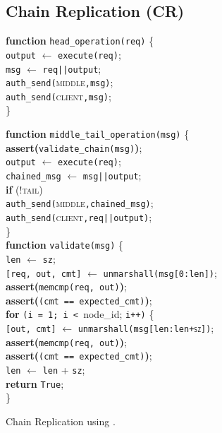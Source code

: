 %




\subsection{Chain Replication (CR)}\label{sec:use_cases::byz_chain_rep}

\begin{algorithm}
\SetAlgoLined
\small
\textbf{function} \texttt{head\_operation(req)} \{ \\
\Indp
 {\tt output} $\leftarrow$ \texttt{execute(req)};\\
 {\tt msg} $\leftarrow$ \texttt{req||output};\\
 \texttt{auth\_send(}\textsc{middle}{\tt,msg)};\\ \texttt{auth\_send(}\textsc{client}{\tt,msg)};\\
\Indm
\} \\

\vspace{0.15cm}

\textbf{function} \texttt{middle\_tail\_operation(msg)} \{ \\
\Indp
    {\bf assert(}\texttt{validate\_chain(msg)}{\bf)};\\
    {\tt output} $\leftarrow$ \texttt{execute(req)};\\
    {\tt chained\_msg} $\leftarrow$ \texttt{msg||output};\\
    {\bf if} (!\textsc{tail})\\
    \Indp
    \texttt{auth\_send(}\textsc{middle}{\tt,chained\_msg)};\\
    \Indm
    \texttt{auth\_send(}\textsc{client}{\tt,req||output)};\\
\Indm
\} \\
\vspace{0.15cm}
\textbf{function} \texttt{validate(msg)} \{ \\
\Indp
    \texttt{len} $\leftarrow$ \texttt{sz};\\
    \texttt{[req, out, cmt]} $\leftarrow$ \texttt{unmarshall(msg[0:len])};\\
    {\bf assert(}\texttt{memcmp(req, out)}{\bf)};\\
    {\bf assert(}\texttt{(cmt == expected\_cmt)}{\bf)};\\
    {\bf for} {\tt(i = 1; i < }{\sc node\_id}; {\tt i++)} \{\\
    \Indp
    \texttt{[out, cmt]} $\leftarrow$ \texttt{unmarshall(msg[len:len+\textsc{sz}])};\\
    {\bf assert(}\texttt{memcmp(req, out)}{\bf)};\\
    {\bf assert(}\texttt{(cmt == expected\_cmt)}{\bf)};\\
    \texttt{len} $\leftarrow$ \texttt{len} + \texttt{sz};\\
    \Indm
    {\bf return} {\tt True};\\
\Indm
\} \\
\vspace{-1pt}
\caption{Chain Replication using \projecttitle{}.}
\label{algo:tnic_chain_replication}
\end{algorithm}
